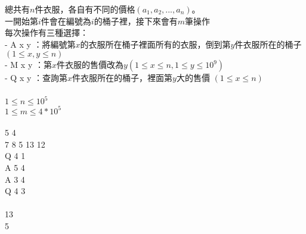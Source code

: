 總共有$n$件衣服，各自有不同的價格$(a_1, a_2, ..., a_n)$。\\
一開始第$i$件會在編號為$i$的桶子裡，接下來會有$m$筆操作\\
每次操作有三種選擇：\\
- A x y ：將編號第$x$的衣服所在桶子裡面所有的衣服，倒到第$y$件衣服所在的桶子 $(1 ≤ x, y ≤ n)$\\
- M x y ：第$x$件衣服的售價改為$y (1 ≤ x ≤ n, 1 ≤ y ≤ 10^9)$\\
- Q x y ：查詢第$x$件衣服所在的桶子，裡面第$y$大的售價 $(1 ≤ x ≤ n)$\\
\\
$1 ≤ n ≤ 10^5$\\
$1 ≤ m ≤ 4 * 10^5$\\
\\
5 4\\
7 8 5 13 12\\
Q 4 1\\
A 5 4\\
A 3 4\\
Q 4 3\\
\\
13\\
5